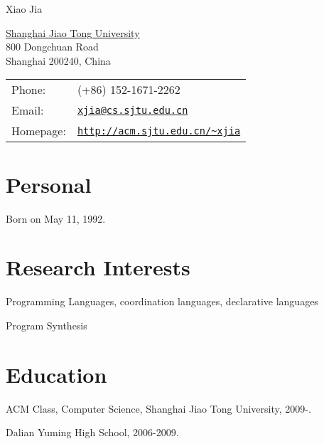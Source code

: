 \documentclass[letterpaper]{article}
\def\name{Xiao Jia}
\renewenvironment{itemize}{
  \begin{list}{}{
    \setlength{\leftmargin}{1.5em}
    \vspace{-1mm}
  }
}{
  \end{list}
}
\begin{document}
{\huge \name}


\vspace{0.25in}

\begin{minipage}{0.45\linewidth}
  \href{http://www.sjtu.edu.cn/}{Shanghai Jiao Tong University} \\
  800 Dongchuan Road \\
  Shanghai 200240, China
\end{minipage}
\begin{minipage}{0.45\linewidth}
  \begin{tabular}{ll}
    Phone: & (+86) 152-1671-2262 \\
    Email: & \href{mailto:xjia@cs.sjtu.edu.cn}{\tt xjia@cs.sjtu.edu.cn} \\
    Homepage: & \href{http://acm.sjtu.edu.cn/~xjia}{\tt http://acm.sjtu.edu.cn/{\textasciitilde}xjia} \\
  \end{tabular}
\end{minipage}


\section*{Personal}

\begin{itemize}
  \item Born on May 11, 1992.
\end{itemize}


\vspace{-7mm}
\section*{Research Interests}

\begin{itemize}
  \item Programming Languages, coordination languages, declarative languages
  \item Program Synthesis
\end{itemize}


\vspace{-7mm}
\section*{Education}

\begin{itemize}
  \item ACM Class, Computer Science, Shanghai Jiao Tong University, 2009-.
  \item Dalian Yuming High School, 2006-2009.
\end{itemize}
\end{document}
